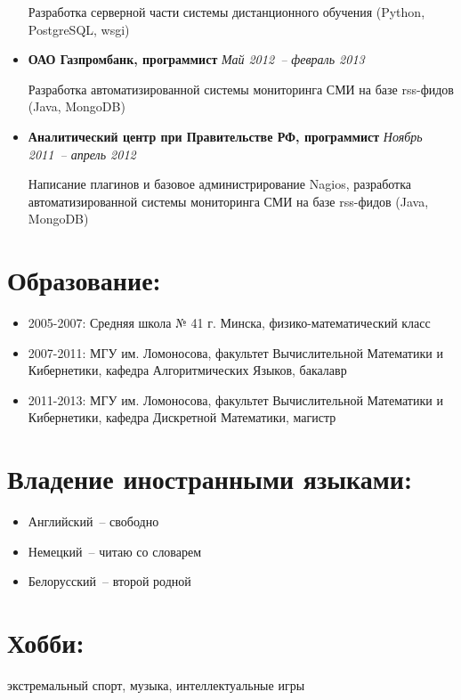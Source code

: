 \documentclass{res}
\begin{document}
\begin{resume}
\begin{itemize}
                Разработка серверной части системы дистанционного обучения (Python, PostgreSQL, wsgi)

            \item[] \textbf{ОАО Газпромбанк, программист} \textit{Май 2012~-- февраль 2013}

                Разработка автоматизированной системы мониторинга СМИ на базе rss-фидов (Java, MongoDB)
            \item[] 
                \textbf{Аналитический центр при Правительстве РФ, программист} \textit{Ноябрь 2011~-- апрель 2012}

                Написание плагинов и базовое администрирование Nagios, 
                разработка автоматизированной системы мониторинга СМИ на базе rss-фидов (Java, MongoDB)
        \end{itemize}

        \section{Образование:}
        \begin{itemize}
            \item 2005-2007: Средняя школа № 41 г. Минска, 
                физико-математический класс
            \item 2007-2011: МГУ им. Ломоносова, факультет
              Вычислительной Математики и Кибернетики, кафедра
              Алгоритмических Языков, бакалавр
           \item 2011-2013: МГУ им. Ломоносова, факультет
               Вычислительной Математики и Кибернетики, кафедра
               Дискретной Математики, магистр
        \end{itemize}

    \section{Владение иностранными языками:}
        \begin{itemize}
            \item Английский~-- свободно
            \item Немецкий~-- читаю со словарем
            \item Белорусский~-- второй родной
        \end{itemize}


    \section{Хобби:} экстремальный спорт, музыка, интеллектуальные игры
    
\end{resume}
\end{document}
